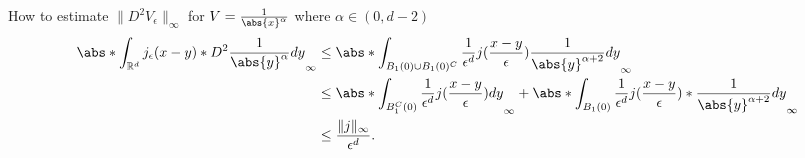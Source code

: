 \begin{example}
  How to estimate  $\|D^2 V_\epsilon\|_{\infty} $  for $V = \frac{1}{\abs{x}^{\alpha } }$ where $\alpha  \in  (0,d-2)$
  \begin{align*}
    \abs*{\int_{\mathbb{R}^{d} }  j_{\epsilon}(x-y)*D^2 \frac{1}{\abs{y}^{\alpha } } dy}_{\infty} &\le \abs*{\int_{B_1(0) \cup B_1(0)^{C} } \frac{1}{\epsilon ^{d} } j(\frac{x-y}{\epsilon}) \frac{1}{\abs{y}^{\alpha +2} } dy }_{\infty} \\ 
                                                                                                  &\le  \abs*{\int_{B_1^{C}(0) } \frac{1}{\epsilon ^{d} } j(\frac{x-y}{\epsilon}) dy}_{\infty} + \abs*{\int_{B_1(0)} \frac{1}{\epsilon ^{d} } j(\frac{x-y}{\epsilon})*\frac{1}{\abs{y}^{\alpha +2} } dy}_{\infty}\\
                                                                                                  &\le  \frac{\|j\|_{\infty}}{\epsilon ^{d} } 
  .\end{align*}
\end{example}
